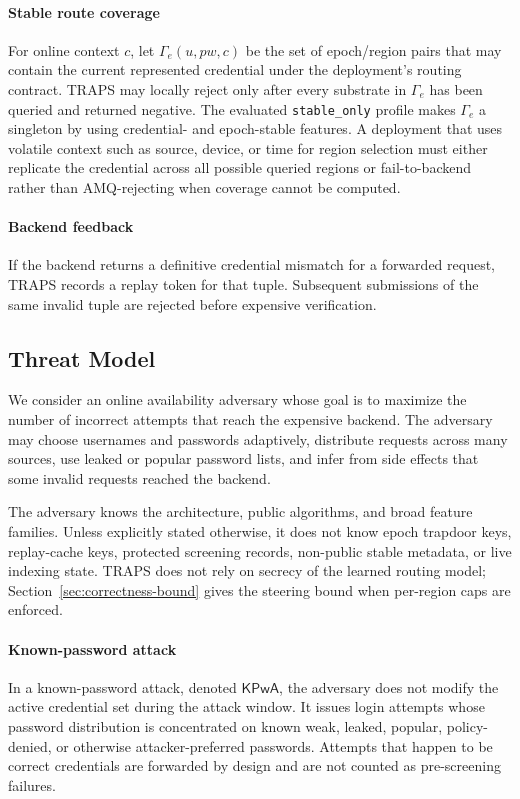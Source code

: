 \paragraph{Stable route coverage}
For online context \(c\), let \(\Gamma_e(u,pw,c)\) be the set of epoch/region pairs that may contain the current represented credential under the deployment's routing contract. TRAPS may locally reject only after every substrate in \(\Gamma_e\) has been queried and returned negative. The evaluated \texttt{stable\_only} profile makes \(\Gamma_e\) a singleton by using credential- and epoch-stable features. A deployment that uses volatile context such as source, device, or time for region selection must either replicate the credential across all possible queried regions or fail-to-backend rather than AMQ-rejecting when coverage cannot be computed.

\paragraph{Backend feedback}
If the backend returns a definitive credential mismatch for a forwarded request, TRAPS records a replay token for that tuple. Subsequent submissions of the same invalid tuple are rejected before expensive verification.

\subsection{Threat Model}
\label{sec:threat-model}

We consider an online availability adversary whose goal is to maximize the number of incorrect attempts that reach the expensive backend. The adversary may choose usernames and passwords adaptively, distribute requests across many sources, use leaked or popular password lists, and infer from side effects that some invalid requests reached the backend.

The adversary knows the architecture, public algorithms, and broad feature families. Unless explicitly stated otherwise, it does not know epoch trapdoor keys, replay-cache keys, protected screening records, non-public stable metadata, or live indexing state. TRAPS does not rely on secrecy of the learned routing model; Section~\ref{sec:correctness-bound} gives the steering bound when per-region caps are enforced.

\paragraph{Known-password attack}
In a known-password attack, denoted \(\mathsf{KPwA}\), the adversary does not modify the active credential set during the attack window. It issues login attempts whose password distribution is concentrated on known weak, leaked, popular, policy-denied, or otherwise attacker-preferred passwords. Attempts that happen to be correct credentials are forwarded by design and are not counted as pre-screening failures.


